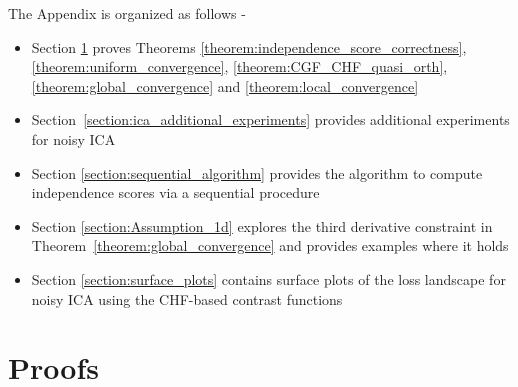 \documentclass[letterpaper]{article}
\newtheorem{theorem}{Theorem}
\newcommand{\bas}[1]{\begin{align*}#1\end{align*}}
\newcommand{\bx}{\pmb{x}}
\newcommand{\bt}{\pmb{t}}
\newcommand{\E}{\mathbb{E}}
\newcommand{\bb}[1]{\left(#1\right)}
\newcommand{\bbb}[1]{\left[#1\right]}
\DeclareMathOperator{\diag}{diag}
\begin{document}
\setcounter{theorem}{0}
\setcounter{section}{0}
\setcounter{figure}{0}
\setcounter{lemma}{0}
\setcounter{proposition}{0}

The Appendix is organized as follows - 

\begin{itemize}
    \item Section \ref{section:proofs} proves Theorems \ref{theorem:independence_score_correctness}, \ref{theorem:uniform_convergence}, \ref{theorem:CGF_CHF_quasi_orth},   \ref{theorem:global_convergence} and \ref{theorem:local_convergence} 
    \item Section~\ref{section:ica_additional_experiments} provides additional experiments for noisy ICA
    \item Section \ref{section:sequential_algorithm} provides the algorithm to compute independence scores via a sequential procedure
    \item Section \ref{section:Assumption_1d} explores the third derivative constraint in Theorem~\ref{theorem:global_convergence} and provides examples where it holds
    \item Section \ref{section:surface_plots} contains surface plots of the loss landscape for noisy ICA using the CHF-based contrast functions
\end{itemize}

\section{Proofs}
\label{section:proofs}
\vspace{5pt}
\end{document}
